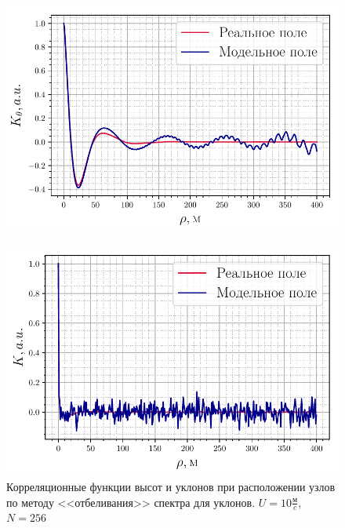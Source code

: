 \begin{figure}[h!]
	\begin{minipage}{0.49\linewidth}
			\centering
			\includegraphics[width=\linewidth]{fig/correlation_height_slopes2.pdf}
			\label{fig:ch21}		
	\end{minipage}
	\hfill
	\begin{minipage}{0.49\linewidth}
			\centering
			\includegraphics[width=\linewidth]{fig/correlation_angles_slopes2.pdf}
	\end{minipage}
	\caption{Корреляционные функции высот и уклонов при расположении узлов по методу <<отбеливания>> спектра для уклонов. $U=10 \frac{\text{м}}{c}$, $N=256$}
			\label{fig:ca21}		
\end{figure}


